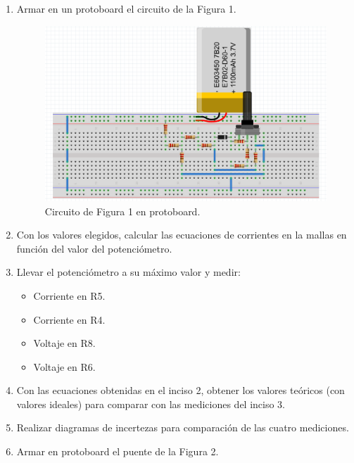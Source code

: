 \documentclass[letterpaper, 12 pt, conference]{ieeeconf}  %
\begin{document}
\begin{enumerate}
    \item Armar en un protoboard el circuito de la Figura 1.

\begin{figure}[h!]
    \centering
    \includegraphics[scale=0.4]{B1.png}
    \caption{Circuito de Figura 1 en protoboard.}
\end{figure}

    \item Con los valores elegidos, calcular las ecuaciones de corrientes en la mallas en función del valor del potenciómetro.
    \item Llevar el potenciómetro a su máximo valor y medir:
    \begin{itemize}
        \item Corriente en R5.
        \item Corriente en R4.
        \item Voltaje en R8.
        \item Voltaje en R6.
    \end{itemize}
    \item Con las ecuaciones obtenidas en el inciso 2, obtener los valores teóricos (con valores ideales) para comparar con las mediciones del inciso 3.
    \item Realizar diagramas de incertezas para comparación de las cuatro mediciones.
    \item Armar en protoboard el puente de la Figura 2.
    

\end{enumerate}
\end{document}
